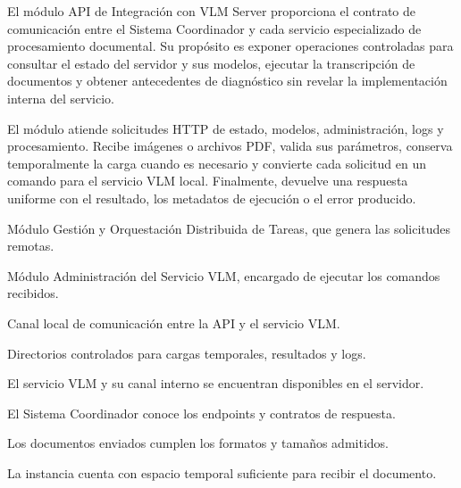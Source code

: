 \begin{definicionmodulo}

\item[Propósito] El módulo API de Integración con VLM Server proporciona el contrato de comunicación entre el Sistema Coordinador y cada servicio especializado de procesamiento documental. Su propósito es exponer operaciones controladas para consultar el estado del servidor y sus modelos, ejecutar la transcripción de documentos y obtener antecedentes de diagnóstico sin revelar la implementación interna del servicio.

\item[Alcance] El módulo atiende solicitudes HTTP de estado, modelos, administración, logs y procesamiento. Recibe imágenes o archivos PDF, valida sus parámetros, conserva temporalmente la carga cuando es necesario y convierte cada solicitud en un comando para el servicio VLM local. Finalmente, devuelve una respuesta uniforme con el resultado, los metadatos de ejecución o el error producido.

\item[Dependencias]
\begin{elementosmodulo}
    \item Módulo Gestión y Orquestación Distribuida de Tareas, que genera las solicitudes remotas.
    \item Módulo Administración del Servicio VLM, encargado de ejecutar los comandos recibidos.
    \item Canal local de comunicación entre la API y el servicio VLM.
    \item Directorios controlados para cargas temporales, resultados y logs.
\end{elementosmodulo}

\item[Supuestos]
\begin{elementosmodulo}
    \item El servicio VLM y su canal interno se encuentran disponibles en el servidor.
    \item El Sistema Coordinador conoce los endpoints y contratos de respuesta.
    \item Los documentos enviados cumplen los formatos y tamaños admitidos.
    \item La instancia cuenta con espacio temporal suficiente para recibir el documento.
\end{elementosmodulo}


\end{definicionmodulo}
